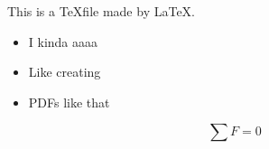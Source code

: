 \documentclass{article}
\begin{document}
    This is a \TeX file made by \LaTeX.
    \begin{itemize}
        \item I kinda aaaa
        \item Like creating
        \item PDFs like that
    \end{itemize}

    \begin{equation}
        \sum F = 0
    \end{equation}

\end{document}
